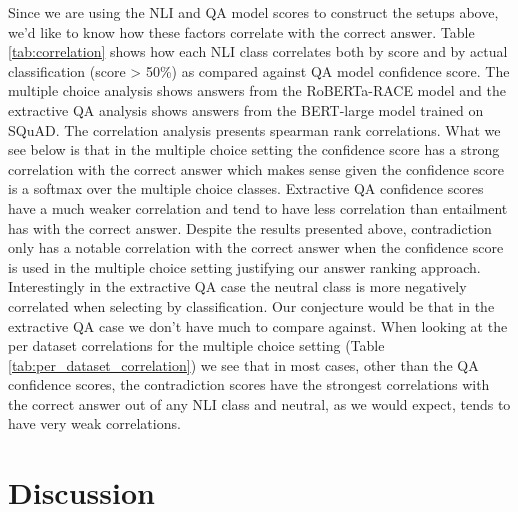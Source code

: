 \documentclass[11pt]{article}
\begin{document}
Since we are using the NLI and QA model scores to construct the setups above, we’d like to know how these factors correlate with the correct answer. Table \ref{tab:correlation} shows how each NLI class correlates both by score and by actual classification (score > 50\%) as compared against QA model confidence score. The multiple choice analysis shows answers from the RoBERTa-RACE model and the extractive QA analysis shows answers from the BERT-large model trained on SQuAD. The correlation analysis presents spearman rank correlations. What we see below is that in the multiple choice setting the confidence score has a strong correlation with the correct answer which makes sense given the confidence score is a softmax over the multiple choice classes. Extractive QA confidence scores have a much weaker correlation and tend to have less correlation than entailment has with the correct answer. Despite the results presented above, contradiction only has a notable correlation with the correct answer when the confidence score is used in the multiple choice setting justifying our answer ranking approach. Interestingly in the extractive QA case the neutral class is more negatively correlated when selecting by classification. Our conjecture would be that in the extractive QA case we don’t have much to compare against. When looking at the per dataset correlations for the multiple choice setting (Table \ref{tab:per_dataset_correlation}) we see that in most cases, other than the QA confidence scores, the contradiction scores have the strongest correlations with the correct answer out of any NLI class and neutral, as we would expect, tends to have very weak correlations.
\section{Discussion}
\end{document}
